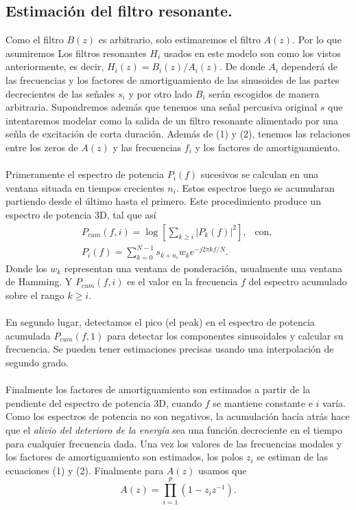 \documentclass[11pt]{amsart}
\theoremstyle{plain}
\theoremstyle{definition}
\begin{document}
\subsection{Estimación del filtro resonante.}
Como el filtro $B(z)$ es arbitrario, solo estimaremos el filtro $A(z)$. Por lo que asumiremos 
Los filtros resonantes $H_i$ usados en este modelo son como los vistos anteriormente, es decir, $H_i(z)=B_i(z)/A_i(z)$. De donde $A_i$ dependerá de las frecuencias y los factores de amortiguamiento de las sinusoides de las partes decrecientes de las señales $s_i$ y por otro lado $B_i$ serán escogidos de manera arbitraria. Supondremos además que tenemos una señal percusiva original $s$ que intentaremos modelar como la salida de un filtro resonante alimentado por una señla de excitación de corta duración. Además de (1) y (2), tenemos las relaciones entre los zeros de $A(z)$ y las frecuencias $f_i$ y los factores de amortiguamiento.\\ \\
 Primeramente el espectro de potencia $P_i(f)$ sucesivos se calculan en una ventana situada en tiempos crecientes $n_i$. Estos espectros luego se acumularan partiendo desde el último hasta el primero. Este procedimiento produce un espectro de potencia 3D, tal que así
\begin{eqnarray}
P_{cum}(f,i)=\log\left[\sum_{k \geq i} |P_k(f)|^2\right], \ \ \text{ con, } \\
P_i(f)=\sum_{k=0}^{N-1}s_{k+n_i}w_k e^{-j2\pi k f /N}.
\end{eqnarray}
Donde los $w_k$ representan una ventana de ponderación, usualmente una ventana de Hamming. Y $P_{cum}(f,i)$ es el valor en la frecuencia $f$ del espectro acumulado sobre el rango $k\geq i$. \\ \\
En segundo lugar, detectamos el pico (el peak) en el espectro de potencia acumulada $P_{cum}(f,1)$ para detectar los componentes sinusoidales y calcular su frecuencia. Se pueden tener estimaciones precisas usando una interpolación de segundo grado. \\ \\
Finalmente los factores de amortiguamiento son estimados a partir de la pendiente del espectro de potencia 3D, cuando $f$ se mantiene constante e $i$ varía. Como los espectros de potencia no son negativos, la acumulación hacía atrás hace que el \textit{alivio del deterioro de la energía} sea una función decreciente en el tiempo para cualquier frecuencia dada. Una vez los valores de las frecuencias modales y los factores de amortiguamiento son estimados, los polos $z_i$ se estiman de las ecuaciones (1) y (2). Finalmente para $A(z)$ usamos que
$$
A(z)=\prod_{i=1}^{p}(1-z_iz^{-1}).
$$
\end{document}
